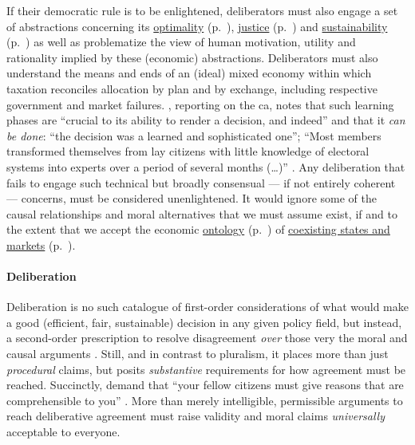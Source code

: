 If their democratic rule is to be enlightened, deliberators must also engage a set of abstractions concerning its \hyperref[sec:tax-optimality]{optimality} (p.~\pageref{sec:tax-optimality}), \hyperref[sec:tax-justice]{justice} (p.~\pageref{sec:tax-justice}) and \hyperref[sec:tax-sustainability]{sustainability} (p.~\pageref{sec:tax-sustainability}) as well as problematize the view of human motivation, utility and rationality implied by these (economic) abstractions.
Deliberators must also understand the means and ends of an (ideal) mixed economy within which taxation reconciles allocation by plan and by exchange, including respective government and market failures.
\citeauthor[K1513]{Warren2008}, reporting on the \gls{ca}, notes that such learning phases are ``crucial to its ability to  render a decision, and indeed'' and that it \emph{can be done}:
``the decision was a learned and sophisticated one'';
``Most members transformed themselves from lay citizens with little knowledge of electoral systems into experts over a period of several months (\ldots)'' \citeyearpar[K1513]{Warren2008}.
Any deliberation that fails to engage such technical but broadly consensual --- if not entirely coherent --- concerns, must be considered unenlightened.
It would ignore some of the causal relationships and moral alternatives that we must assume exist, if and to the extent that we accept the economic \hyperref[sec:ontology]{ontology} (p.~\pageref{sec:ontology}) of \hyperref[chap:mixed-economy]{coexisting states and markets} (p.~\pageref{chap:mixed-economy}).

\paragraph{Deliberation}
Deliberation is no such catalogue of first-order considerations of what would make a good (efficient, fair, sustainable) decision in any given policy field, but instead, a second-order prescription to resolve disagreement \emph{over} those very the moral and causal arguments \citep[125]{GutmannThompson-2004-aa}.
Still, and in contrast to pluralism, it places more than just \emph{procedural} claims, but posits \emph{substantive} requirements for how agreement must be reached.
Succinctly, \citeauthor{GutmannThompson-2004-aa} demand that ``your fellow citizens must give reasons that are comprehensible to you'' \citeyearpar[K177]{GutmannThompson-2004-aa}.
More than merely intelligible, permissible arguments to reach deliberative agreement must raise validity \citep{Habermas-1984} and moral \citep{Rawls-1971} claims \emph{universally} acceptable to everyone.

